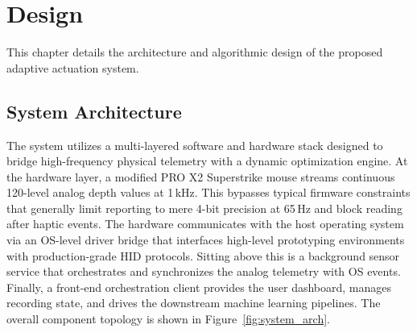 \chapter{Design}
\label{chap:design}

This chapter details the architecture and algorithmic design of the proposed adaptive actuation system.

\section{System Architecture}
The system utilizes a multi-layered software and hardware stack designed to bridge high-frequency physical telemetry with a dynamic optimization engine. At the hardware layer, a modified PRO X2 Superstrike mouse streams continuous 120-level analog depth values at 1\,kHz. This bypasses typical firmware constraints that generally limit reporting to mere 4-bit precision at 65\,Hz and block reading after haptic events. The hardware communicates with the host operating system via an OS-level driver bridge that interfaces high-level prototyping environments with production-grade HID protocols. Sitting above this is a background sensor service that orchestrates and synchronizes the analog telemetry with OS events. Finally, a front-end orchestration client provides the user dashboard, manages recording state, and drives the downstream machine learning pipelines. The overall component topology is shown in Figure~\ref{fig:system_arch}.

